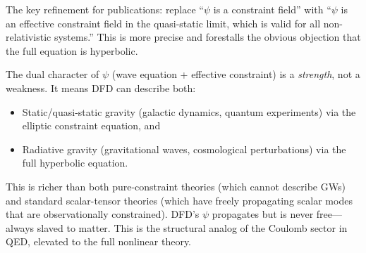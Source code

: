 \documentclass[12pt,a4paper]{article}
\begin{document}
The key refinement for publications: replace ``$\psi$ is a constraint field''
with ``$\psi$ is an effective constraint field in the quasi-static limit,
which is valid for all non-relativistic systems.'' This is more precise and
forestalls the obvious objection that the full equation is hyperbolic.

\begin{tcolorbox}[colback=green!5!white, colframe=dfdgreen,
title=Bottom Line]
The dual character of $\psi$ (wave equation + effective constraint) is a
\emph{strength}, not a weakness. It means DFD can describe both:
\begin{itemize}
\item Static/quasi-static gravity (galactic dynamics, quantum experiments)
via the elliptic constraint equation, and
\item Radiative gravity (gravitational waves, cosmological perturbations)
via the full hyperbolic equation.
\end{itemize}
This is richer than both pure-constraint theories (which cannot describe
GWs) and standard scalar-tensor theories (which have freely propagating
scalar modes that are observationally constrained). DFD's $\psi$ propagates
but is never free---always slaved to matter. This is the structural analog
of the Coulomb sector in QED, elevated to the full nonlinear theory.
\end{tcolorbox}
\end{document}
